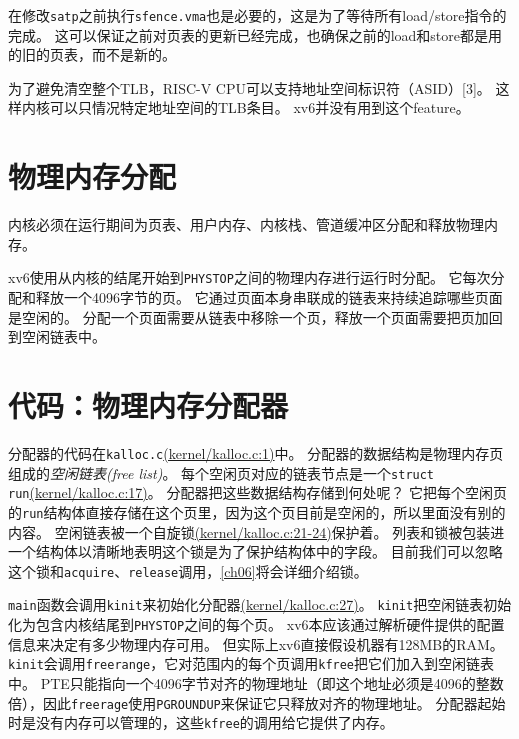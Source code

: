 在修改\texttt{satp}之前执行\texttt{sfence.vma}也是必要的，这是为了等待所有load/store指令的完成。
这可以保证之前对页表的更新已经完成，也确保之前的load和store都是用的旧的页表，而不是新的。

为了避免清空整个TLB，RISC-V CPU可以支持地址空间标识符（ASID）[3]。
这样内核可以只情况特定地址空间的TLB条目。
xv6并没有用到这个feature。

\section{物理内存分配}
内核必须在运行期间为页表、用户内存、内核栈、管道缓冲区分配和释放物理内存。

xv6使用从内核的结尾开始到\texttt{PHYSTOP}之间的物理内存进行运行时分配。
它每次分配和释放一个4096字节的页。
它通过页面本身串联成的链表来持续追踪哪些页面是空闲的。
分配一个页面需要从链表中移除一个页，释放一个页面需要把页加回到空闲链表中。

\section{代码：物理内存分配器}
分配器的代码在\texttt{kalloc.c}\href{https://github.com/mit-pdos/xv6-riscv/blob/riscv//kernel/kalloc.c#L1}{(kernel/kalloc.c:1)}中。
分配器的数据结构是物理内存页组成的\emph{空闲链表(free list)}。
每个空闲页对应的链表节点是一个\texttt{struct run}\href{https://github.com/mit-pdos/xv6-riscv/blob/riscv//kernel/kalloc.c#L17}{(kernel/kalloc.c:17)}。
分配器把这些数据结构存储到何处呢？
它把每个空闲页的\texttt{run}结构体直接存储在这个页里，因为这个页目前是空闲的，所以里面没有别的内容。
空闲链表被一个自旋锁\href{https://github.com/mit-pdos/xv6-riscv/blob/riscv//kernel/kalloc.c#L21-L24}{(kernel/kalloc.c:21-24)}保护着。
列表和锁被包装进一个结构体以清晰地表明这个锁是为了保护结构体中的字段。
目前我们可以忽略这个锁和\texttt{acquire}、\texttt{release}调用，\autoref{ch06}将会详细介绍锁。

\texttt{main}函数会调用\texttt{kinit}来初始化分配器\href{https://github.com/mit-pdos/xv6-riscv/blob/riscv//kernel/kalloc.c#L27}{(kernel/kalloc.c:27)}。
\texttt{kinit}把空闲链表初始化为包含内核结尾到\texttt{PHYSTOP}之间的每个页。
xv6本应该通过解析硬件提供的配置信息来决定有多少物理内存可用。
但实际上xv6直接假设机器有128MB的RAM。
\texttt{kinit}会调用\texttt{freerange}，它对范围内的每个页调用\texttt{kfree}把它们加入到空闲链表中。
PTE只能指向一个4096字节对齐的物理地址（即这个地址必须是4096的整数倍），因此\texttt{freerage}使用\texttt{PGROUNDUP}来保证它只释放对齐的物理地址。
分配器起始时是没有内存可以管理的，这些\texttt{kfree}的调用给它提供了内存。

